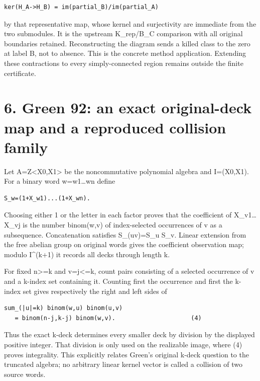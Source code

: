 \documentclass[
  10pt,
]{scrreprt}
\begin{document}
\begin{verbatim}
ker(H_A->H_B) = im(partial_B)/im(partial_A)
\end{verbatim}

by that representative map, whose kernel and surjectivity are immediate
from the two submodules. It is the upstream K\_rep/B\_C comparison with
all original boundaries retained. Reconstructing the diagram sends a
killed class to the zero at label B, not to absence. This is the
concrete method application. Extending these contractions to every
simply-connected region remains outside the finite certificate.

\section{6. Green 92: an exact original-deck map and a reproduced
collision family}\label{edition-3-section-6}

Let A=Z\textless X0,X1\textgreater{} be the noncommutative polynomial
algebra and I=(X0,X1). For a binary word w=w1\ldots wn define

\begin{verbatim}
S_w=(1+X_w1)...(1+X_wn).
\end{verbatim}

Choosing either 1 or the letter in each factor proves that the
coefficient of X\_v1\ldots X\_vj is the number binom(w,v) of
index-selected occurrences of v as a subsequence. Concatenation
satisfies S\_(uv)=S\_u S\_v. Linear extension from the free abelian
group on original words gives the coefficient observation map; modulo
I\^{}(k+1) it records all decks through length k.

For fixed n\textgreater=k and \textbar v\textbar=j\textless=k, count
pairs consisting of a selected occurrence of v and a k-index set
containing it. Counting first the occurrence and first the k-index set
gives respectively the right and left sides of

\begin{verbatim}
sum_(|u|=k) binom(w,u) binom(u,v)
   = binom(n-j,k-j) binom(w,v).                     (4)
\end{verbatim}

Thus the exact k-deck determines every smaller deck by division by the
displayed positive integer. That division is only used on the realizable
image, where (4) proves integrality. This explicitly relates Green's
original k-deck question to the truncated algebra; no arbitrary linear
kernel vector is called a collision of two source words.
\end{document}
